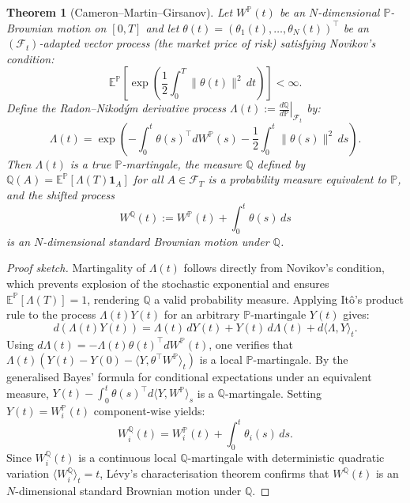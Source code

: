 \documentclass{article}
\theoremstyle{plain}
\newtheorem{theorem}{Theorem}[section]
\theoremstyle{definition}
\theoremstyle{remark}
\begin{document}
\begin{theorem}[Cameron--Martin--Girsanov]
Let $W^{\mathbb{P}}(t)$ be an $N$-dimensional $\mathbb{P}$-Brownian motion on $[0, T]$ and let $\theta(t) = (\theta_1(t), \dots, \theta_N(t))^\top$ be an $(\mathcal{F}_t)$-adapted vector process (the market price of risk) satisfying Novikov's condition:
\begin{equation}
\mathbb{E}^\mathbb{P}\left[\exp\left(\frac{1}{2}\int_0^T \|\theta(t)\|^2\,dt\right)\right] < \infty.
\end{equation}
Define the Radon--Nikod\'ym derivative process $\Lambda(t) := \left.\frac{d\mathbb{Q}}{d\mathbb{P}}\right|_{\mathcal{F}_t}$ by:
\begin{equation}
\Lambda(t) = \exp\left(-\int_0^t \theta(s)^\top dW^{\mathbb{P}}(s) - \frac{1}{2}\int_0^t \|\theta(s)\|^2\,ds\right).
\end{equation}
Then $\Lambda(t)$ is a true $\mathbb{P}$-martingale, the measure $\mathbb{Q}$ defined by $\mathbb{Q}(A) = \mathbb{E}^\mathbb{P}[\Lambda(T)\mathbf{1}_A]$ for all $A \in \mathcal{F}_T$ is a probability measure equivalent to $\mathbb{P}$, and the shifted process
\begin{equation}
W^{\mathbb{Q}}(t) := W^{\mathbb{P}}(t) + \int_0^t \theta(s)\,ds
\end{equation}
is an $N$-dimensional standard Brownian motion under $\mathbb{Q}$.
\end{theorem}

\begin{proof}[Proof sketch]
Martingality of $\Lambda(t)$ follows directly from Novikov's condition, which prevents explosion of the stochastic exponential and ensures $\mathbb{E}^\mathbb{P}[\Lambda(T)] = 1$, rendering $\mathbb{Q}$ a valid probability measure. Applying It\^o's product rule to the process $\Lambda(t)Y(t)$ for an arbitrary $\mathbb{P}$-martingale $Y(t)$ gives:
\begin{equation}
d(\Lambda(t)Y(t)) = \Lambda(t)\,dY(t) + Y(t)\,d\Lambda(t) + d\langle \Lambda, Y \rangle_t.
\end{equation}
Using $d\Lambda(t) = -\Lambda(t)\theta(t)^\top dW^{\mathbb{P}}(t)$, one verifies that $\Lambda(t)\left(Y(t) - Y(0) - \langle Y, \theta^\top W^\mathbb{P} \rangle_t\right)$ is a local $\mathbb{P}$-martingale. By the generalised Bayes' formula for conditional expectations under an equivalent measure, $Y(t) - \int_0^t \theta(s)^\top d\langle Y, W^\mathbb{P}\rangle_s$ is a $\mathbb{Q}$-martingale. Setting $Y(t) = W_i^\mathbb{P}(t)$ component-wise yields:
\begin{equation}
W_i^\mathbb{Q}(t) = W_i^\mathbb{P}(t) + \int_0^t \theta_i(s)\,ds.
\end{equation}
Since $W_i^\mathbb{Q}(t)$ is a continuous local $\mathbb{Q}$-martingale with deterministic quadratic variation $\langle W_i^\mathbb{Q}\rangle_t = t$, L\'evy's characterisation theorem confirms that $W^\mathbb{Q}(t)$ is an $N$-dimensional standard Brownian motion under $\mathbb{Q}$.
\end{proof}
\end{document}
